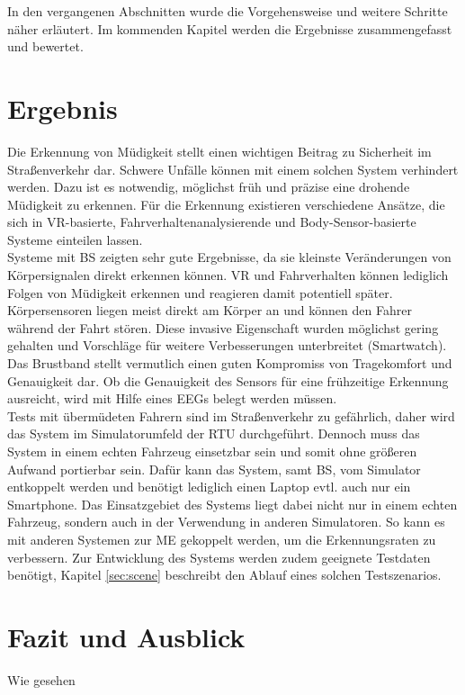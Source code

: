 {In den vergangenen Abschnitten wurde die Vorgehensweise und weitere Schritte näher erläutert. Im kommenden Kapitel werden die Ergebnisse zusammengefasst und bewertet.


\section{Ergebnis}
\label{chap:result}
Die Erkennung von Müdigkeit stellt einen wichtigen Beitrag zu Sicherheit im Straßenverkehr dar. Schwere Unfälle können mit einem solchen System verhindert werden. Dazu ist es notwendig, möglichst früh und präzise eine drohende Müdigkeit zu erkennen. Für die Erkennung existieren verschiedene Ansätze, die sich in VR-basierte, Fahrverhaltenanalysierende und Body-Sensor-basierte Systeme einteilen lassen. \\

Systeme mit \acl{BS} zeigten sehr gute Ergebnisse, da sie kleinste Veränderungen von Körpersignalen direkt erkennen können. VR und Fahrverhalten können lediglich Folgen von Müdigkeit erkennen und reagieren damit potentiell später. Körpersensoren liegen meist direkt am Körper an und können den Fahrer während der Fahrt stören. Diese invasive Eigenschaft wurden möglichst gering gehalten und Vorschläge für weitere Verbesserungen unterbreitet (Smartwatch). Das Brustband stellt vermutlich einen guten Kompromiss von Tragekomfort und Genauigkeit dar. Ob die Genauigkeit des Sensors für eine frühzeitige Erkennung ausreicht, wird mit Hilfe eines EEGs belegt werden müssen.\\

Tests mit übermüdeten Fahrern sind im Straßenverkehr zu gefährlich, daher wird das System im Simulatorumfeld der \acl{RTU} durchgeführt. Dennoch muss das System in einem echten Fahrzeug einsetzbar sein und somit ohne größeren Aufwand portierbar sein. Dafür kann das System, samt \acl{BS}, vom Simulator entkoppelt werden und benötigt lediglich einen Laptop evtl. auch nur ein Smartphone. Das Einsatzgebiet des Systems liegt dabei nicht nur in einem echten Fahrzeug, sondern auch in der Verwendung in anderen Simulatoren. So kann es mit anderen Systemen zur \acl{ME} gekoppelt werden, um die Erkennungsraten zu verbessern.
Zur Entwicklung des Systems werden zudem geeignete Testdaten benötigt, Kapitel \ref{sec:scene} beschreibt den Ablauf eines solchen Testszenarios.


\section{Fazit und Ausblick}
\label{chap:outro}
Wie gesehen

}
